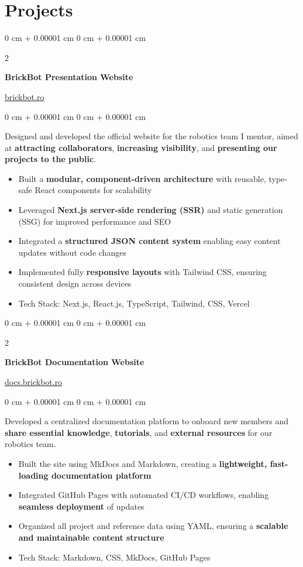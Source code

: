 \documentclass[10pt, letterpaper]{article}
\newenvironment{highlights}{
    \begin{itemize}[
        topsep=0.10 cm,
        parsep=0.10 cm,
        partopsep=0pt,
        itemsep=0pt,
        leftmargin=0 cm + 10pt
    ]
}{
    \end{itemize}
} %
\newenvironment{onecolentry}{
    \begin{adjustwidth}{
        0 cm + 0.00001 cm
    }{
        0 cm + 0.00001 cm
    }
}{
    \end{adjustwidth}
} %
\newenvironment{twocolentry}[2][]{
    \onecolentry
    \def\secondColumn{#2}
    \setcolumnwidth{\fill, 4.5 cm}
    \begin{paracol}{2}
}{
    \switchcolumn \raggedleft \secondColumn
    \end{paracol}
    \endonecolentry
} %
\begin{document}
    
    \section{Projects}

        \begin{twocolentry}{
    \href{https://brickbot.ro}{brickbot.ro}
}
    \textbf{BrickBot Presentation Website}
\end{twocolentry}

\vspace{0.10 cm}
\begin{onecolentry}
    Designed and developed the official website for the robotics team I mentor, aimed at \textbf{attracting collaborators}, \textbf{increasing visibility}, and \textbf{presenting our projects to the public}.
    \begin{highlights}
    \item Built a \textbf{modular, component-driven architecture} with reusable, type-safe React components for scalability
    \item Leveraged \textbf{Next.js server-side rendering (SSR)} and static generation (SSG) for improved performance and SEO
    \item Integrated a \textbf{structured JSON content system} enabling easy content updates without code changes
    \item Implemented fully \textbf{responsive layouts} with Tailwind CSS, ensuring consistent design across devices
    \item Tech Stack: Next.js, React.js, TypeScript, Tailwind, CSS, Vercel
\end{highlights}
\end{onecolentry}

\vspace{0.2 cm}

 \begin{twocolentry}{
    \href{https://docs.brickbot.ro}{docs.brickbot.ro}
}
    \textbf{BrickBot Documentation Website}
\end{twocolentry}
\vspace{0.10 cm}
\begin{onecolentry}
    Developed a centralized documentation platform to onboard new members and \textbf{share essential knowledge}, \textbf{tutorials}, and \textbf{external resources} for our robotics team.
    \begin{highlights}
    \item Built the site using MkDocs and Markdown, creating a \textbf{lightweight, fast-loading documentation platform}
    \item Integrated GitHub Pages with automated CI/CD workflows, enabling \textbf{seamless deployment} of updates
    \item Organized all project and reference data using YAML, ensuring a \textbf{scalable and maintainable content structure}
    \item Tech Stack: Markdown, CSS, MkDocs, GitHub Pages
\end{highlights}
\end{onecolentry}
\end{document}
